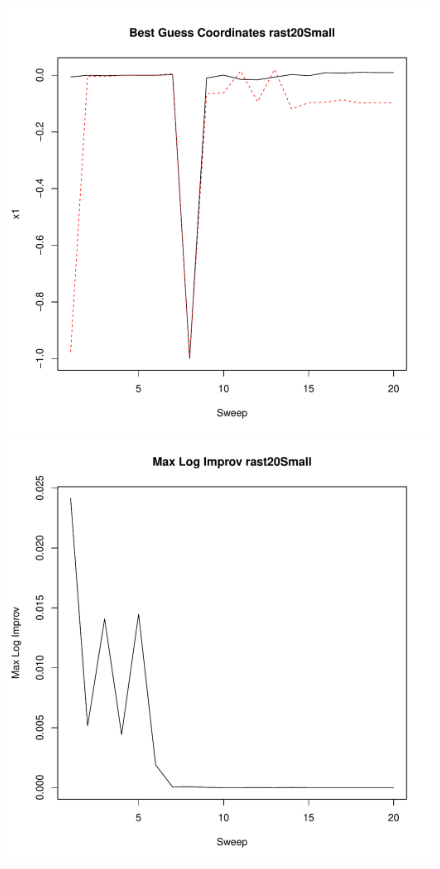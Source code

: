 \documentclass{article}
\begin{document}
\clearpage

\begin{figure}
	\begin{center}
		\begin{minipage}[h!]{0.49\textwidth}
			\includegraphics[width=1.0\textwidth]{rast20SmallCoord.pdf}
		\end{minipage}
		\begin{minipage}[h!]{0.49\textwidth}
			\includegraphics[width=1.0\textwidth]{rast20SmallMLI.pdf}	
		\end{minipage}
	\end{center}
\end{figure}
\end{document}
